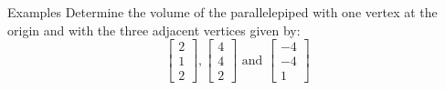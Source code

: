 \documentclass{beamer}
\begin{document}
\begin{frame}{Examples}
Determine the volume of the parallelepiped with one vertex at the origin and with the three adjacent vertices given by:
\begin{equation*}
\left[
\begin{matrix}
2\\
1\\
2
\end{matrix}
\right], \left[
\begin{matrix}
4\\
4\\
2
\end{matrix}
\right]\text{ and }
\left[
\begin{matrix}
-4\\
-4\\
1
\end{matrix}
\right]
\end{equation*}
\end{frame}
\end{document}
